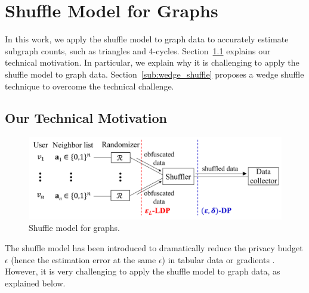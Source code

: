 \section{Shuffle Model for Graphs}
\label{sec:shuffle}
In this work, we apply the shuffle model to graph data to accurately estimate subgraph counts, such as triangles and 4-cycles. 
Section~\ref{sub:technical} explains our technical motivation. 
In particular, we explain why it is challenging to apply the shuffle model to graph data. 
Section~\ref{sub:wedge_shuffle} proposes a wedge shuffle technique to overcome the technical challenge. 

\subsection{Our Technical Motivation}
\label{sub:technical}

\begin{figure}[t]
  \centering
  \includegraphics[width=0.99\linewidth]{fig/shuffle.pdf}
  \vspace{-2mm}
  \caption{Shuffle model for graphs. 
  }
  \label{fig:shuffle_model}
\end{figure}

The shuffle model has been introduced to dramatically reduce the privacy budget $\epsilon$ (hence the estimation error at the same $\epsilon$) in tabular data \cite{Meehan_ICLR22,Wang_PVLDB20} or 
gradients 
\cite{Girgis_AISTATS21,Liu_AAAI21}. 
However, it is very challenging to apply the shuffle model to graph data, 
as explained below. 

